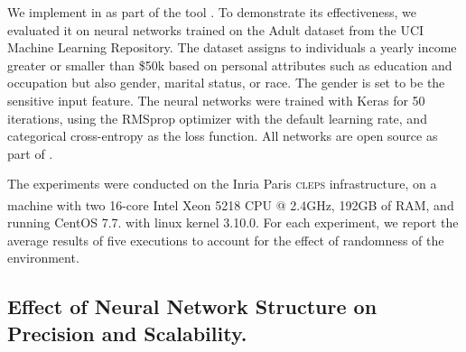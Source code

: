 We implement \qlibraname{} in \python{} as part of the tool \libra\sidenote{\libraurl}.
%
To demonstrate its effectiveness, we evaluated it on neural networks trained on
the
Adult dataset from the UCI Machine Learning Repository.
%
The dataset assigns to individuals a yearly income greater or smaller than \$50k based on personal attributes such as education and occupation but also gender, marital status, or race.
The gender is set to be the sensitive input feature.
%
%
The neural networks were trained with Keras for 50 iterations, using the RMSprop optimizer with the default learning rate, and categorical cross-entropy as the loss function.
%
All networks are open source as part of \libra.

%

The experiments were conducted on the Inria Paris \textsc{cleps} infrastructure, on a machine with two 16-core Intel\textsuperscript{\tiny{\textregistered}} Xeon\textsuperscript{\tiny{\textregistered}} 5218 CPU @ 2.4GHz, 192GB of RAM, and running CentOS 7.7. with linux kernel 3.10.0.
%
For each experiment, we report the average results of five executions to account for the effect of randomness of the environment.


\subsection{Effect of Neural Network Structure on Precision and Scalability.}

